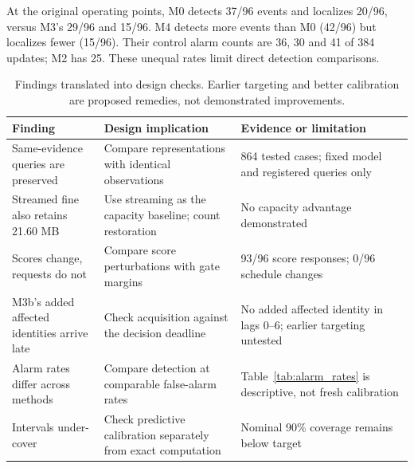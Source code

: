 \documentclass[conference]{IEEEtran}
\begin{document}
At the original operating points, M0 detects 37/96 events and localizes 20/96, versus M3's 29/96 and 15/96. M4 detects more events than M0 (42/96) but localizes fewer (15/96). Their control alarm counts are 36, 30 and 41 of 384 updates; M2 has 25. These unequal rates limit direct detection comparisons.

\begin{table}[!htbp]
\caption{Descriptive detection comparison at common control-alarm ceilings. Each entry counts detected events out of 96 using lags 0--6. Column headers give attained alarmed-control-update rates, common to all methods, below nominal ceilings of 2\%, 5\% and 10\%.}
\label{tab:alarm_rates}\centering

\end{table}

\begin{table}[!t]
\caption{Findings translated into design checks. Earlier targeting and better calibration are proposed remedies, not demonstrated improvements.}
\label{tab:guidance}\centering
\begin{tabular}{p{}p{}p{}}
\toprule
Finding & Design implication & Evidence or limitation\\
\midrule
Same-evidence queries are preserved & Compare representations with identical observations & 864 tested cases; fixed model and registered queries only\\
Streamed fine also retains 21.60 MB & Use streaming as the capacity baseline; count restoration & No capacity advantage demonstrated\\
Scores change, requests do not & Compare score perturbations with gate margins & 93/96 score responses; 0/96 schedule changes\\
M3b's added affected identities arrive late & Check acquisition against the decision deadline & No added affected identity in lags 0--6; earlier targeting untested\\
Alarm rates differ across methods & Compare detection at comparable false-alarm rates & Table~\ref{tab:alarm_rates} is descriptive, not fresh calibration\\
Intervals under-cover & Check predictive calibration separately from exact computation & Nominal 90\% coverage remains below target\\
\bottomrule
\end{tabular}
\end{table}
\end{document}
